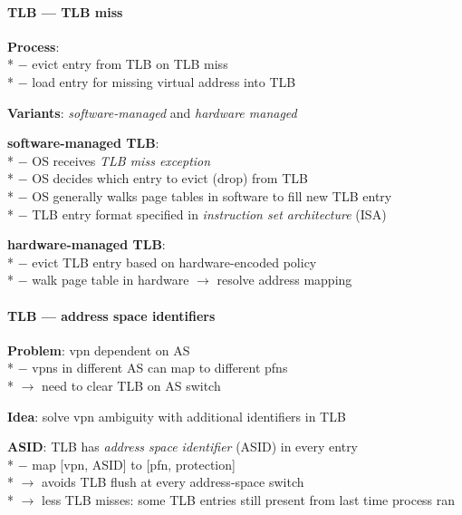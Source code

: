 \paragraph{TLB --- TLB miss}
\begin{items}
  \item \textbf{Process}: \\*
    $ - $ evict entry from TLB on TLB miss \\*
    $ - $ load entry for missing virtual address into TLB
  \item \textbf{Variants}: \emph{software-managed} and \emph{hardware managed}
  \item \textbf{software-managed TLB}: \\*
    $ - $ OS receives \emph{TLB miss exception} \\*
    $ - $ OS decides which entry to evict (drop) from TLB \\*
    $ - $ OS generally walks page tables in software to fill new TLB entry \\*
    $ - $ TLB entry format specified in \emph{instruction set architecture} (ISA)
  \item \textbf{hardware-managed TLB}: \\*
    $ - $ evict TLB entry based on hardware-encoded policy \\*
    $ - $ walk page table in hardware $ \to $ resolve address mapping
\end{items}

\paragraph{TLB --- address space identifiers}
\begin{items}
  \item \textbf{Problem}: vpn dependent on AS \\*
    $ - $ vpns in different AS can map to different pfns \\*
    $ \to $ need to clear TLB on AS switch
  \item \textbf{Idea}: solve vpn ambiguity with additional identifiers in TLB
  \item \textbf{ASID}: TLB has \emph{address space identifier} (ASID) in every entry \\*
    $ - $ map [vpn, ASID] to [pfn, protection] \\*
    $ \to $ avoids TLB flush at every address-space switch \\*
    $ \to $ less TLB misses: some TLB entries still present from last time process ran
\end{items}

